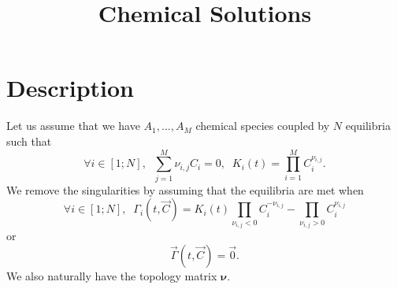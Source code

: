 \documentclass[aps]{revtex4}
\newcommand{\mymat}[1]{\bm{#1}}
\begin{document}
\title{Chemical Solutions}

\section{Description}
Let us assume that we have $A_1,\ldots,A_M$ chemical species coupled by
$N$ equilibria such that
\begin{equation}
	\forall i \in [1;N], \;\; \sum_{j=1}^{M} \nu_{i,j} C_i = 0, \;\; K_i(t) = \prod_{i=1}^{M} C_i^{\nu_{i,j}}.
\end{equation}
We remove the singularities by assuming that the equilibria are met when
\begin{equation}
	\forall i \in [1;N], \;\; \Gamma_i(t,\vec{C}) = K_i(t) \prod_{\nu_{i,j}<0}  C_i^{-\nu_{i,j}} -  \prod_{\nu_{i,j}>0} C_i^{\nu_{i,j}} 
\end{equation}
or
\begin{equation}
	\vec{\Gamma}(t,\vec{C}) = \vec{0}.
\end{equation}
We also naturally have the topology matrix $\mymat{\nu}$.
\end{document}
